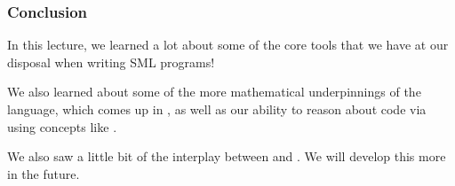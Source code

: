 \documentclass[aspectratio=169]{beamer}
\begin{document}




\begin{frame}[fragile]
  \frametitle{Conclusion}

  In this lecture, we learned a lot about some of the core
  tools that we have at our disposal when writing SML programs!

  \pause
  \vspace{\fill}

  We also learned about some of the more mathematical underpinnings
  of the language, which comes up in ,
  as well as our ability to reason about code via using concepts
  like .

  \pause
  \vspace{\fill}

  We also saw a little bit of the interplay between 
  and . We will develop this more in the future.
\end{frame}



\thankyou
\end{document}
